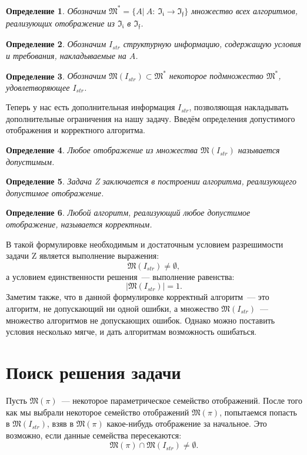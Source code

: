 \documentclass[a4paper, 12pt]{report}
\newtheorem{definition}{Определение}[chapter]
\begin{document}
\begin{definition}
Обозначим $\mathfrak{M}^* = \{A|\ A:\  \mathfrak{I_i}\rightarrow \mathfrak{I_f}\}$ множество всех алгоритмов, реализующих отображение из $\mathfrak{I_i}$ в $\mathfrak{I_f}$.
\end{definition}

\begin{definition}
Обозначим $I_{str}$ структурную информацию, содержащую условия и требования, накладываемые на $A$.
\end{definition}

\begin{definition}
Обозначим $\mathfrak{M}(I_{str}) \subset \mathfrak{M}^*$ некоторое подмножество $\mathfrak{M}^*$, удовлетворяющее $I_{str}$.
\end{definition}

Теперь у нас есть дополнительная информация $I_{str}$, позволяющая накладывать дополнительные ограничения на нашу задачу. Введём определения допустимого отображения и корректного алгоритма.

\begin{definition}
Любое отображение из множества $\mathfrak{M}(I_{str})$ называется допустимым.
\end{definition}

\begin{definition}
Задача Z заключается в построении алгоритма, реализующего допустимое отображение.
\end{definition}

\begin{definition}
Любой алгоритм, реализующий любое допустимое отображение, называется корректным.
\end{definition}

В такой формулировке необходимым и достаточным условием разрешимости задачи Z является выполнение выражения:
\[
\mathfrak{M}(I_{str}) \neq \emptyset,
\]
а условием единственности решения~--- выполнение равенства:
\[
|\mathfrak{M}(I_{str})| = 1.
\]
Заметим также, что в данной формулировке корректный алгоритм~--- это алгоритм, не допускающий ни одной ошибки, а множество $\mathfrak{M}(I_{str})$~--- множество алгоритмов не допускающих ошибок. Однако можно поставить условия несколько мягче, и дать алгоритмам возможность ошибаться.

\section{Поиск решения задачи}
Пусть $\mathfrak{M}(\pi)$~--- некоторое параметрическое семейство отображений. После того как мы выбрали некоторое семейство отображений $\mathfrak{M}(\pi)$, попытаемся попасть в $\mathfrak{M}(I_{str})$, взяв в $\mathfrak{M}(\pi)$ какое-нибудь отображение за начальное. Это возможно, если данные семейства пересекаются:
\[
\mathfrak{M}(\pi) \cap \mathfrak{M}(I_{str}) \neq \emptyset.
\]
\end{document}
